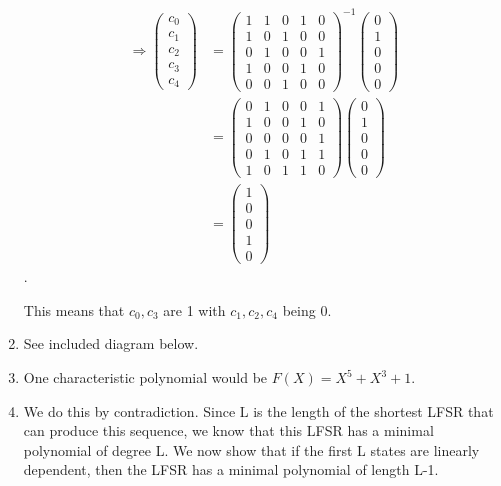 \begin{enumerate}
\begin{align*}
\Rightarrow 
\begin{pmatrix}
c_0 \\ c_1 \\ c_2 \\ c_3 \\ c_4
\end{pmatrix}
&=
\begin{pmatrix}
1 & 1 & 0 & 1 & 0 \\
1 & 0 & 1 & 0 & 0 \\
0 & 1 & 0 & 0 & 1 \\
1 & 0 & 0 & 1 & 0 \\
0 & 0 & 1 & 0 & 0 
\end{pmatrix}^{-1}
\begin{pmatrix} 0 \\  1 \\ 0 \\ 0 \\ 0 \end{pmatrix} \\
&=
\begin{pmatrix}
0 & 1 & 0 & 0 & 1 \\
1 & 0 & 0 & 1 & 0 \\
0 & 0 & 0 & 0 & 1 \\
0 & 1 & 0 & 1 & 1 \\
1 & 0 & 1 & 1 & 0
\end{pmatrix}
\begin{pmatrix} 0 \\  1 \\ 0 \\ 0 \\ 0 \end{pmatrix} \\
&=
\begin{pmatrix} 1 \\  0 \\ 0 \\ 1 \\ 0 \end{pmatrix}
\end{align*}.

This means that $c_0, c_3$ are 1 with $c_1, c_2, c_4$ being 0.

\item See included diagram below.


\item One characteristic polynomial would be $F(X) = X^5 + X^3 + 1$.

\item We do this by contradiction. Since L is the length of the shortest LFSR
that can produce this sequence, we know that this LFSR has a minimal polynomial of
degree L. We now show that if the first L states are linearly dependent,
then the LFSR has a minimal polynomial of length L-1.


\end{enumerate}
